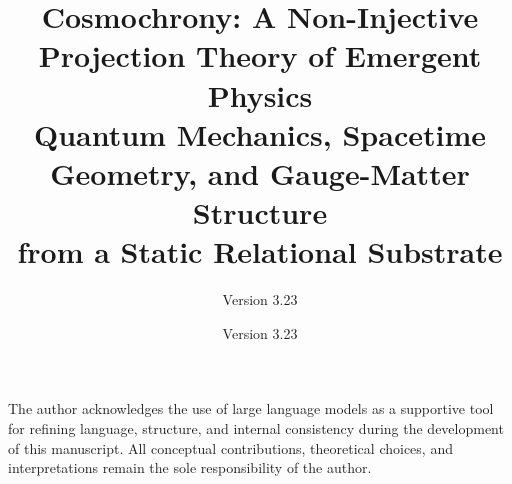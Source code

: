 \documentclass[pdflatex,sn-mathphys-num]{sn-jnl} %
\title{%
\centering
Cosmochrony: A Non-Injective Projection Theory of Emergent Physics\\[0.5em]
\normalsize Quantum Mechanics, Spacetime Geometry, and Gauge-Matter Structure\\
from a Static Relational Substrate%
}
\author*[1]{\fnm{Jérôme} \sur{Beau}}\email{jerome.beau@cosmochrony.org}
\affil*[1]{\orgname{Independent Researcher}, Paris, \country{France}}
\date{Version 3.23}
\subtitle{Version 3.23}
\theoremstyle{remark}
\theoremstyle{definition}
\theoremstyle{plain}
\begin{document}
  \maketitle

  \clearpage
  \tableofcontents

  
  
  
  
  

  \appendix


  

    \backmatter

    The author acknowledges the use of large language models as a supportive tool
    for refining language, structure, and internal consistency during the
    development of this manuscript.
    All conceptual contributions, theoretical choices, and interpretations remain the sole responsibility of the author.

    
\end{document}
